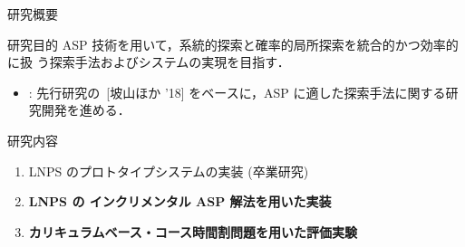 \documentclass[11pt,dvipdfmx]{beamer}
\begin{document}
\begin{frame}{研究概要}
  \begin{alertblock}{研究目的}\centering
    ASP 技術を用いて，系統的探索と確率的局所探索を統合的かつ効率的に扱
    う探索手法およびシステムの実現を目指す．
  \end{alertblock}

  \begin{itemize}
  \item {}:
    先行研究の~[坡山ほか '18]
    をベースに，ASP に適した探索手法に関する研究開発を進める．
  \end{itemize}

  \begin{block}{研究内容}
    \begin{enumerate}
    \item LNPS のプロトタイプシステムの実装 (卒業研究)
    \item \alert{\bf LNPS の インクリメンタル ASP 解法を用いた実装}
    \item \alert{\bf カリキュラムベース・コース時間割問題を用いた評価実験}
    \end{enumerate}
  \end{block}
\end{frame}
\end{document}
